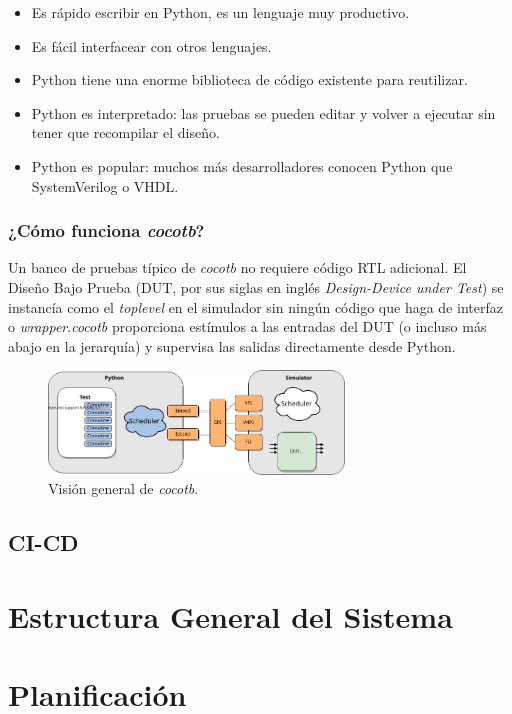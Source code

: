 \begin{itemize}
  \item Es rápido escribir en Python, es un lenguaje muy productivo.
  \item Es fácil interfacear con otros lenguajes.
  \item Python tiene una enorme biblioteca de código existente para reutilizar.
  \item Python es interpretado: las pruebas se pueden editar y volver a ejecutar
  sin tener que recompilar el diseño.
  \item Python es popular: muchos más desarrolladores conocen Python que
  SystemVerilog o VHDL.
\end{itemize}

\subsubsection{¿Cómo funciona \textit{cocotb}?}

Un banco de pruebas típico de \textit{cocotb} no requiere código RTL adicional.
El Diseño Bajo Prueba (DUT, por sus siglas en inglés \textit{Design-Device
under Test}) se instancía como el \textit{toplevel} en el simulador sin ningún
código que haga de interfaz o \textit{wrapper}.\textit{cocotb} proporciona
estímulos a las entradas del DUT (o incluso más abajo en la jerarquía) y
supervisa las salidas directamente desde Python.

\begin{figure}[h]
  \centering
  \includegraphics[width=0.7\textwidth]{./Figures/cocotb_overview.png}
  \caption{Visión general de \textit{cocotb}.}
\end{figure}


\subsection{CI-CD}

\section{Estructura General del Sistema}

\section{{Planificación}}

